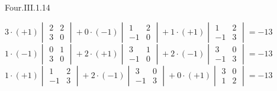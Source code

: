 \begin{ans}{Four.III.1.14}
      \begin{exparts}
         \partsitem \( 3\cdot(+1)\begin{vmatrix}
                          2  &2  \\
                          3  &0
                       \end{vmatrix}
                 +0\cdot (-1)\begin{vmatrix}
                          1  &2  \\
                         -1  &0
                       \end{vmatrix}
                 +1\cdot (+1)\begin{vmatrix}
                          1  &2  \\
                         -1  &3
                       \end{vmatrix} =-13 \)
         \partsitem \( 1\cdot (-1)\begin{vmatrix}
                          0  &1  \\
                          3  &0
                       \end{vmatrix}
                 +2\cdot (+1)\begin{vmatrix}
                          3  &1  \\
                         -1  &0
                       \end{vmatrix}
                 +2\cdot (-1)\begin{vmatrix}
                          3  &0  \\
                         -1  &3
                       \end{vmatrix} =-13 \)
         \partsitem \( 1\cdot (+1)\begin{vmatrix}
                          1  &2  \\
                         -1  &3
                       \end{vmatrix}
                 +2\cdot (-1)\begin{vmatrix}
                          3  &0  \\
                         -1  &3
                       \end{vmatrix}
                 +0\cdot (+1)\begin{vmatrix}
                          3  &0  \\
                          1  &2
                       \end{vmatrix} =-13 \)
       \end{exparts}
     
\end{ans}
